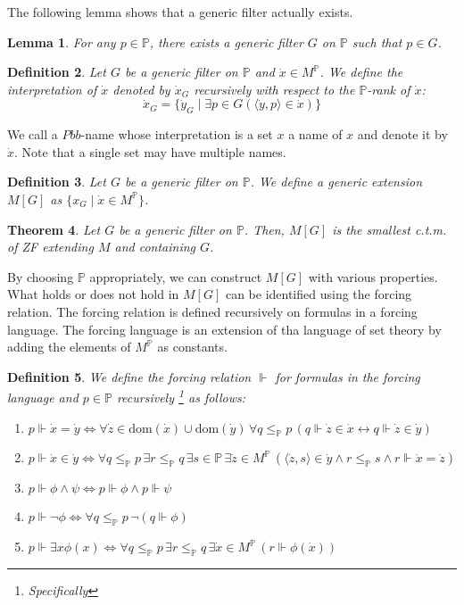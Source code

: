 \documentclass{report}
\newtheorem{thm}{Theorem}[chapter]
\newtheorem{lem}[thm]{Lemma}
\newtheorem{dfn}[thm]{Definition}
\newcommand{\Pbb}{\mathbb{P}}
\begin{document}
The following lemma shows that a generic filter actually exists.
\begin{lem} 
  For any $p \in \Pbb$, there exists a generic filter $G$ on $\Pbb$ such that $p \in G$.
\end{lem}

\begin{dfn} 
  Let $G$ be a generic filter on $\Pbb$ and $\dot{x} \in M^{\Pbb}$. We define the \emph{interpretation} of $\dot{x}$ denoted by $\dot{x}_G$ recursively with respect to the $\Pbb$-rank of $\dot{x}$:
  $$\dot{x}_G = \{\dot{y}_G \mid \exists p \in G (\langle \dot{y}, p \rangle \in \dot{x})\}$$ 
\end{dfn}

We call a $Pbb$-name whose interpretation is a set $x$ a name of $x$ and denote it by $\dot{x}$.
Note that a single set may have multiple names.

\begin{dfn} 
  Let $G$ be a generic filter on $\Pbb$. We define a \emph{generic extension} $M[G]$ as $\{x_G \mid \dot{x} \in M^{\Pbb}\}$.
\end{dfn}

\begin{thm} 
  Let $G$ be a generic filter on $\Pbb$. Then, $M[G]$ is the smallest c.t.m. of ZF extending $M$ and containing $G$.
\end{thm}

By choosing $\Pbb$ appropriately, we can construct $M[G]$ with various properties.
What holds or does not hold in $M[G]$ can be identified using the forcing relation.
The forcing relation is defined recursively on formulas in a forcing language.
The forcing language is an extension of tha language of set theory by adding the elements of $M^{\Pbb}$ as constants.
\begin{dfn} %
  We define the \emph{forcing relation} $\Vdash$ for formulas in the forcing language and $p \in \Pbb$ recursively
  \footnote{Specifically}
  as follows:
  \begin{enumerate}
    \item $p \Vdash \dot{x} = \dot{y} \Leftrightarrow \forall \dot{z} \in \text{dom}(\dot{x}) \cup \text{dom}(\dot{y})\,
\forall q \leq_{\Pbb} p \, (q \Vdash \dot{z} \in \dot{x} \leftrightarrow q \Vdash \dot{z} \in \dot{y})$
    \item $p \Vdash \dot{x} \in \dot{y} \Leftrightarrow \forall q \leq_{\Pbb} p\, \exists r \leq_{\Pbb} q \, 
    \exists s \in \Pbb \, \exists \dot{z} \in M^{\Pbb} \, (\langle \dot{z}, s \rangle \in \dot{y} \land r \leq_{\Pbb} s \land r \Vdash \dot{x} = \dot{z} )$
    \item $p \Vdash \phi \land \psi \Leftrightarrow p \Vdash \phi \land p \Vdash \psi$
    \item $p \Vdash \neg \phi \Leftrightarrow \forall q \leq_{\Pbb} p \, \neg (q \Vdash \phi)$
    \item $p \Vdash \exists x \phi(x) \Leftrightarrow \forall q \leq_{\Pbb} p \, \exists r \leq_{\Pbb} q \, \exists \dot{x} \in M^{\Pbb} \, (r \Vdash \phi(\dot{x}))$
  \end{enumerate}
\end{dfn}
\end{document}
